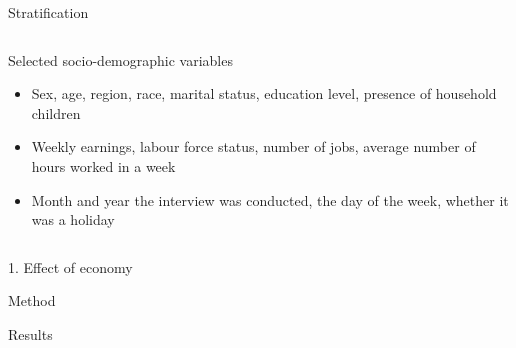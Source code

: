\documentclass[final]{beamer}
\newcounter{acolumn}%
\def\autoheight{\vspace*{0pt}}%
\begin{document}
\begin{frame}
\begin{acolumns}[t]
\begin{column}{.24\linewidth}
\begin{block}{Stratification}
                \autoheight
               \end{block}
               
              \end{column}
               
              \begin{column}{.24\linewidth}
               \begin{block}{Selected socio-demographic variables}
                \begin{itemize}
                	\item Sex, age, region, race, marital status, education level, presence of household children
                	
                	\item Weekly earnings, labour force status, number of jobs, average number of hours worked in a week
                	
                	\item Month and year the interview was conducted, the day of the week, whether it was a holiday
                	
                \end{itemize}
                             
                \autoheight
               \end{block}
                  
              \end{column}
              
            \end{acolumns}
        
        
        \vfill
    
    \begin{acolumns}[t]
    
    \begin{column}{.64\linewidth}
    \begin{center}
   		\LARGE{1. Effect of economy}
    \end{center}
     \begin{block}{Method}
                
        
     \end{block}
     
     
     \begin{block}{Results}
                     
      \autoheight 
     \end{block}
     

\end{column}
\end{acolumns}
\end{frame}
\end{document}
